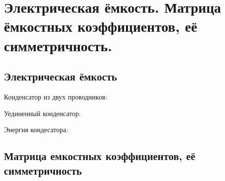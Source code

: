 \section{Электрическая ёмкость. Матрица ёмкостных коэффициентов, её симметричность.}

\subsection*{Электрическая ёмкость}

Конденсатор из двух проводников:



Уединенный конденсатор:



Энергия кондесатора:


\newpage

\subsection*{Матрица емкостных коэффициентов, её симметричность}




